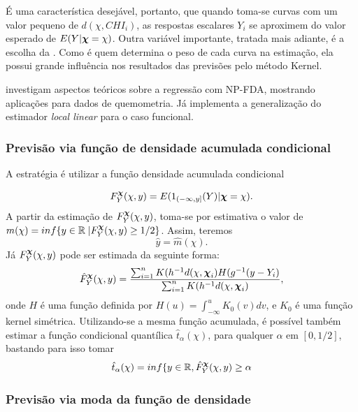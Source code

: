 \documentclass[
	12pt,				%
	openright,			%
	oneside,			%
	a4paper,			%
	english,			%
	brazil				%
	]{dissertacao-ufrgs-abntex2}
\begin{document}
É uma característica desejável, portanto, que quando toma-se curvas com um valor pequeno de $d(\chi,CHI_i)$, as respostas escalares $Y_i$ se aproximem do valor esperado de $E(Y|\boldsymbol{\chi} = \chi)$. Outra variável importante, tratada mais adiante, é a escolha da \bw. Como é \bw quem determina o peso de cada curva na estimação, ela possui grande influência nos resultados das previsões pelo método Kernel.

 investigam aspectos teóricos sobre a regressão com NP-FDA, mostrando aplicações para dados de quemometria. Já  implementa a generalização do estimador \emph{local linear} para o caso funcional.


\subsubsection*{Previsão via função de densidade acumulada condicional}

A estratégia é utilizar a função densidade acumulada condicional

\begin{equation} \label{fd-acum}
F_{Y}^{\boldsymbol{\chi}}(\chi,y)=E(1_{(-\infty,y]}(Y)|\boldsymbol{\chi}=\chi).
\end{equation}
A partir da estimação de $F_{Y}^{\boldsymbol{\chi}}(\chi,y)$, toma-se por estimativa
o valor de $m(\chi)=inf\{y\in\mathbb{R\mid}F_{Y}^{\boldsymbol{\chi}}(\chi,y)\geq1/2\}$.
Assim, teremos 
\[
\hat{y}=\hat{m}(\chi).
\]
Já $F_{Y}^{\boldsymbol{\chi}}(\chi,y)$ pode ser estimada da seguinte forma:
\begin{equation}
\hat{F}_{Y}^{\boldsymbol{\chi}}(\chi,y)=\frac{\sum_{i=1}^{n}K(h^{-1}d(\chi,\boldsymbol{\chi}_{i})H(g^{-1}(y-Y_{i})}{\sum_{i=1}^{n}K(h^{-1}d(\chi,\boldsymbol{\chi}_{i})},
\end{equation}
onde $H$ é uma função definida por $H(u)=\int_{-\infty}^{u}K_{0}(v)dv$,
e $K_{0}$ é uma função kernel simétrica.
Utilizando-se a mesma função acumulada, é possível também estimar a função condicional quantílica $\hat{t}_{\alpha}(\chi)$, para qualquer $\alpha$ em $[0,1/2]$, bastando para isso tomar
\begin{equation}
\hat{t}_{\alpha}(\chi)=inf\{y\in\mathbb{R},\hat{F}_{Y}^{\boldsymbol{\chi}}(\chi,y)\geq\alpha
\end{equation}


\subsubsection*{Previsão via moda da função de densidade}
\end{document}
